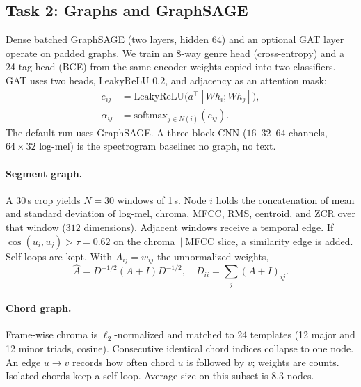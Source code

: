 \documentclass[conference]{IEEEtran}
\begin{document}
\subsection{Task 2: Graphs and GraphSAGE}
\label{sec:graphs}
Dense batched GraphSAGE (two layers, hidden 64) and an optional GAT layer operate on padded graphs. We train an 8-way genre head (cross-entropy) and a 24-tag head (BCE) from the same encoder weights copied into two classifiers. GAT uses two heads, LeakyReLU $0.2$, and adjacency as an attention mask:
\begin{equation}
\begin{aligned}
e_{ij}&=\mathrm{LeakyReLU}\big(a^{\top}[Wh_i;Wh_j]\big),\\
\alpha_{ij}&=\mathrm{softmax}_{j\in N(i)}(e_{ij}).
\end{aligned}
\end{equation}
The default run uses GraphSAGE. A three-block CNN ($16$--$32$--$64$ channels, $64\times 32$ log-mel) is the spectrogram baseline: no graph, no text.

\paragraph{Segment graph.}
A 30\,s crop yields $N=30$ windows of 1\,s. Node $i$ holds the concatenation of mean and standard deviation of log-mel, chroma, MFCC, RMS, centroid, and ZCR over that window ($312$ dimensions). Adjacent windows receive a temporal edge. If $\cos(u_i,u_j)>\tau=0.62$ on the chroma$\|$MFCC slice, a similarity edge is added. Self-loops are kept. With $A_{ij}=w_{ij}$ the unnormalized weights,
\begin{equation}
\hat{A}=D^{-1/2}(A+I)D^{-1/2},\quad
D_{ii}=\sum_j(A+I)_{ij}.
\end{equation}

\paragraph{Chord graph.}
Frame-wise chroma is $\ell_2$-normalized and matched to 24 templates (12 major and 12 minor triads, cosine). Consecutive identical chord indices collapse to one node. An edge $u\to v$ records how often chord $u$ is followed by $v$; weights are counts. Isolated chords keep a self-loop. Average size on this subset is $8.3$ nodes.
\end{document}
